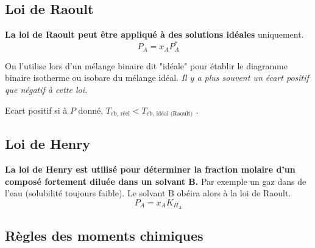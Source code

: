 \documentclass[a4paper,12pt]{article}
\begin{document}
        \subsection{Loi de Raoult}
            
            \textbf{La loi de Raoult peut être appliqué à des solutions idéales} uniquement.
                $$ \boxed{ P_A = x_A P_A^* } $$

            On l'utilise lors d'un mélange binaire dit "idéale" pour établir le diagramme binaire isotherme ou isobare du mélange idéal.
            \textit{Il y a plus souvent un écart positif que négatif à cette loi.}
            
            Ecart positif si à $P$ donné, $T_{\text{eb, réel}} < T_{\text{eb, idéal (Raoult)}}$ .
        

        \subsection{Loi de Henry}
            \textbf{La loi de Henry est utilisé pour déterminer la fraction molaire d'un composé fortement diluée dans un solvant B.} Par exemple un gaz dans de l'eau (solubilité toujours faible).
            Le solvant B obéira alors à la loi de Raoult.
                $$ \boxed{ P_A = x_A K_{H_A} }$$
        
        \subsection{Règles des moments chimiques}
            
\end{document}
